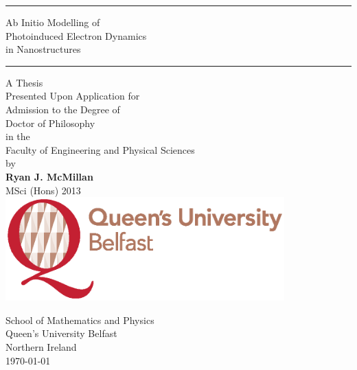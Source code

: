 \thispagestyle{empty}
\begin{center}

    \rule{10cm}{0.5mm}

    \huge
    {\sc
        Ab Initio Modelling of \\
        Photoinduced Electron Dynamics \\
        in Nanostructures 
    }

    \vspace{-0.5cm}
    \rule{10cm}{0.5mm}

    \vspace{1.5cm}
    \Large 
    A Thesis \\[0.5cm]
    Presented Upon Application for \\
    Admission to the Degree of \\[0.5cm]

    \LARGE
    {\sc Doctor of Philosophy} \\[0.5cm]

    \Large 
    in the\\
    Faculty of Engineering and Physical Sciences\\[0.5cm]
    by \\[0.2cm]

    \LARGE
    \textbf{Ryan J. McMillan} \\
    MSci (Hons) 2013 \\[0.7cm]

    \includegraphics[height=4cm]{img/QUB.eps}

    \vspace{0.5cm}
    \Large
        School of Mathematics and Physics\\
        Queen's University Belfast\\
        Northern Ireland\\[0.5cm]
    
    \LARGE
    \monthyeardate\today

    \normalsize
\end{center}
